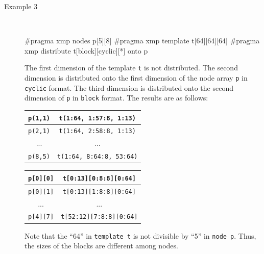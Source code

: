 \begin{description}
\item[Example 3]~\\[0.5cm]
\begin{minipage}{0.44\hsize}
\begin{center}
{\footnotesize
{}
}
\end{center}
\end{minipage}
%
\begin{minipage}{0.52\hsize}
\begin{center}
{\footnotesize
\begin{XCexampleR}
#pragma xmp nodes p[5][8]
#pragma xmp template t[64][64][64]
#pragma xmp distribute t[block][cyclic][*] onto p
\end{XCexampleR}
}
\end{center}
\end{minipage}

The first dimension of the template {\tt t} is not distributed. The
second dimension is distributed onto the first dimension of the node array
{\tt p} in {\tt cyclic} format. The third dimension is distributed onto the
second dimension of {\tt p} in {\tt block} format. The results are as follows:

\begin{minipage}{0.43\hsize}
\begin{center}
\begin{tabular}{|c|c|} \hline
{\tt p(1,1)} & {\tt t(1:64, 1:57:8, 1:13)} \\ \hline
{\tt p(2,1)} & {\tt t(1:64, 2:58:8, 1:13)} \\ \hline
... & ... \\ \hline
{\tt p(8,5)} & {\tt t(1:64, 8:64:8, 53:64)} \\ \hline
\end{tabular}
\end{center}
\end{minipage}
%
\begin{minipage}{0.5\hsize}
\begin{center}
\begin{tabular}{|c|c|} \hline
{\tt p[0][0]} & {\tt t[0:13][0:8:8][0:64]} \\ \hline
{\tt p[0][1]} & {\tt t[0:13][1:8:8][0:64]} \\ \hline
... & ... \\ \hline
{\tt p[4][7]} & {\tt t[52:12][7:8:8][0:64]} \\ \hline
\end{tabular}
\end{center}
\end{minipage}

Note that the ``64'' in {\tt template t} is not divisible by ``5'' in {\tt node p}. 
Thus, the sizes of the blocks are different among nodes.

\end{description}

